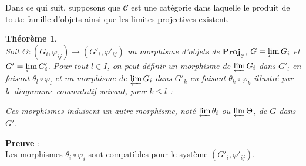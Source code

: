 \documentclass[a4paper, 14pt]{report}
\newtheorem{theorem}{Théorème}[section]
\begin{document}
\begin{onehalfspace}
{			Dans ce qui suit, supposons que $\mathcal{C}$ est une catégorie dans laquelle le produit de toute famille d'objets ainsi que  les limites projectives existent.
			
			\begin{theorem}\cite{guglielmetti2025profinite} \label{prop0} \\
				Soit $\Theta : (G_i, \varphi_{ij}) \longrightarrow (G'_i, \varphi'_{ij})$ un morphisme d'objets de $\mathbf{Proj}_{\mathcal{C}}$, $G = \varprojlim G_i$ et $G' = \varprojlim G'_i$. Pour tout $l \in I$, on peut définir un morphisme de $\varprojlim G_i$ dans $G'_l$ en faisant $\theta_l \circ \varphi_l$ 
				et un morphisme de $\varprojlim G_i$ dans $G'_k$ en faisant $\theta_k \circ \varphi_k$ illustré par le diagramme commutatif suivant, pour $k \leq l$  \cite{guglielmetti2025profinite} :
				
				\begin{center}
				\end{center} Ces morphismes induisent un autre morphisme, noté $\varprojlim \theta_i$ ou $\varprojlim \Theta$, de $G$ dans $G'$. 
				
				
			\end{theorem}
			
			
			\textbf{\underline{Preuve}} : \\
Les morphismes $\theta_i \circ \varphi_i$ sont compatibles pour le système $(G'_i, \varphi'_{ij})$.
			
}
\end{onehalfspace}
\end{document}
